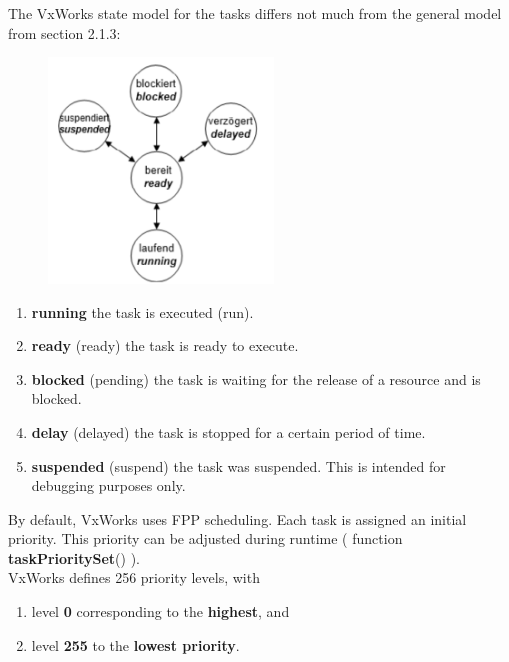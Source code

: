 The VxWorks state model for the tasks differs not much from the general model from section 2.1.3:

 	\begin{figure}[h]
    \centering
    \includegraphics[width=6cm, height=6cm]{Images/image128.png}
    \label{fig:Fig 79}
    \end{figure}

\begin{enumerate}
\item  \textbf{running} the task is executed (run).

\item  \textbf{ready} (ready) the task is ready to execute.

\item  \textbf{blocked} (pending) the task is waiting for the release of a resource and is blocked.

\item  \textbf{delay} (delayed) the task is stopped for a certain period of time.

\item  \textbf{suspended} (suspend) the task was suspended. This is intended for debugging purposes only.
\end{enumerate}

By default, VxWorks uses FPP scheduling. Each task is assigned an initial priority. This priority can be adjusted during runtime ( function \textbf{taskPrioritySet}() ).\\

VxWorks defines 256 priority levels, with 

\begin{enumerate}
\item  level \textbf{0} corresponding to the \textbf{highest}, and 

\item  level \textbf{255} to the \textbf{lowest priority}.
\end{enumerate}

